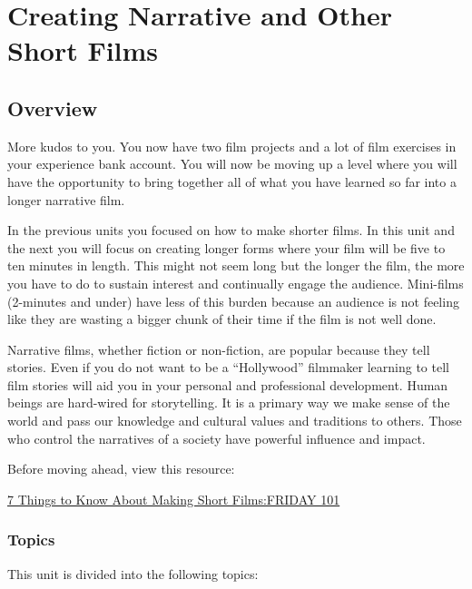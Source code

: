\documentclass[
]{book}
\begin{document}
\hypertarget{creating-narrative-and-other-short-films}{%
\chapter{Creating Narrative and Other Short Films}\label{creating-narrative-and-other-short-films}}

\hypertarget{overview-7}{%
\section*{Overview}\label{overview-7}}

More kudos to you. You now have two film projects and a lot of film exercises in your experience bank account. You will now be moving up a level where you will have the opportunity to bring together all of what you have learned so far into a longer narrative film.

In the previous units you focused on how to make shorter films. In this unit and the next you will focus on creating longer forms where your film will be five to ten minutes in length. This might not seem long but the longer the film, the more you have to do to sustain interest and continually engage the audience. Mini-films (2-minutes and under) have less of this burden because an audience is not feeling like they are wasting a bigger chunk of their time if the film is not well done.

Narrative films, whether fiction or non-fiction, are popular because they tell stories. Even if you do not want to be a ``Hollywood'' filmmaker learning to tell film stories will aid you in your personal and professional development. Human beings are hard-wired for storytelling. It is a primary way we make sense of the world and pass our knowledge and cultural values and traditions to others. Those who control the narratives of a society have powerful influence and impact.

Before moving ahead, view this resource:

\href{https://www.youtube.com/watch?v=mYnsKATCrdw}{7 Things to Know About Making Short Films:FRIDAY 101}

\hypertarget{topics-7}{%
\subsection*{Topics}\label{topics-7}}

This unit is divided into the following topics:
\end{document}
